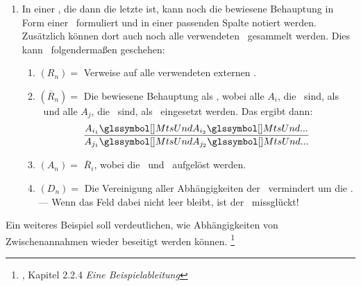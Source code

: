 {\begin{enumerate}
	Nun kann die Zeile beendet werden, oder es geht weiter mit:
	\begin{enumerate}
		\setcounter{enumii}{\value{Enumii}}%
		\item \label{item-Anwendung} $Z_n =$ Die Indizes aller $A_j$ (mit $j < i$), die eine \Voraussetzung\ der \Schlussregel\ $\overline{R}_i$ sind, möglichst in der verwendeten Reihenfolge.
		--- Für jedes angegebene $j$ werden noch die Abhängigkeiten $D_j$ den Abhängigkeiten $D_i$ hinzugefügt.
		\item $A_i =$ \Folgerung(en) der \Schlussregel\ $\overline{R}_i$.
		--- Wenn diese \Folgerungen\ schon als \Aussagen\ $A_j$ (mit $j < i$) vorhanden sind, können auch einfach deren Indizes eingetragen werden.
		Damit werden die Zusammenhänge und der Abschluss des \Beweises\ besser ersichtlich.
		\item $D_i =$ Die Verweise wurden schon in (\ref{item-Anwendung}) eingetragen.%
		\footnote{Wenn $D_n$ leer ist, dann ist $A_n$ allgemeingültig.}
	\end{enumerate}
	Der \Beweis\ muss so lange fortgeführt werden, bis alle \Folgerungen\ als \Aussagen\ in der Spalte $(A_n)$ erschienen und dort jeweils nur von den gegebenen \Voraussetzungen\ abhängig sind.
	\item \label{item-Ergebniszeile} In einer , die dann die letzte ist, kann noch die bewiesene Behauptung in Form einer \Schlussregel\ formuliert und in einer passenden Spalte notiert werden.
	Zusätzlich können dort auch noch alle verwendeten \Schlussregeln\ gesammelt werden.
	Dies kann \textzB\ folgendermaßen geschehen:
	\begin{enumerate}
		\item $(R_n) =$ Verweise auf alle verwendeten externen \Schlussregeln.
		\item $(\overline{R}_n) =$ Die bewiesene Behauptung als \Schlussregeln, wobei alle $A_i$, die \Voraussetzungen\ sind, als \Voraussetzung\ und alle $A_j$, die \Folgerungen\ sind, als \Folgerung\ eingesetzt werden.
		Das ergibt dann:
		\[ \frac{A_{i_1} \MtsUnd A_{i_2} \MtsUnd ...}{A_{j_1} \MtsUnd A_{j_2} \MtsUnd ...} \]
		\item $(A_n) =$ $\overline{R}_i$, wobei die \Voraussetzungen\ und \Folgerungen\ aufgelöst werden.
		\item $(D_n) =$ Die Vereinigung aller Abhängigkeiten der \Folgerungen\, vermindert um die \Voraussetzungen.
		--- Wenn das Feld dabei nicht leer bleibt, ist der \Beweis\ missglückt!
	\end{enumerate}
\end{enumerate}
%
Ein weiteres Beispiel  soll verdeutlichen, wie Abhängigkeiten von Zwischenannahmen wieder beseitigt werden können.%
\footnote{, Kapitel 2.2.4 \emph{Eine Beispielableitung}}

}

